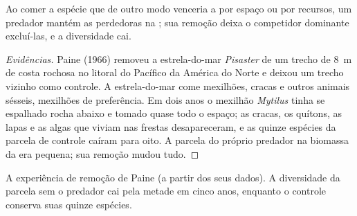 \begin{proposition}\label{prop:b1:species-interactions:paine}
Ao comer a espécie que de outro modo venceria a  por espaço
ou por recursos, um predador mantém as perdedoras na ; sua
remoção deixa o competidor dominante excluí-las, e a diversidade cai.
\end{proposition}
\begin{proof}[Evidências]
Paine (1966) removeu a estrela-do-mar \emph{Pisaster} de um trecho de
\qty{8}{m} de costa rochosa no litoral do Pacífico da América do
Norte e deixou um trecho vizinho como controle. A estrela-do-mar come
mexilhões, cracas e outros animais sésseis, mexilhões de preferência.
Em dois anos o mexilhão \emph{Mytilus} tinha se espalhado rocha abaixo
e tomado quase todo o espaço; as cracas, os quítons, as lapas e as
algas que viviam nas frestas desapareceram, e as quinze espécies da
parcela de controle caíram para oito. A parcela do próprio predador na
biomassa da  era pequena; sua remoção mudou tudo.
\end{proof}

\begin{omfigure}

{\small A experiência de remoção de Paine (a partir dos seus dados). A
diversidade da parcela sem o predador cai pela metade em cinco anos,
enquanto o controle conserva suas quinze espécies.}
\end{omfigure}

